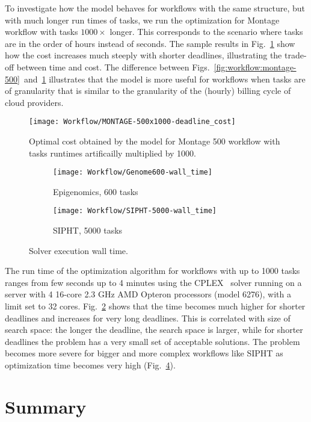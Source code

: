 {    To investigate how the model behaves for workflows with the same structure, but with much longer run times of tasks, we run the optimization for Montage workflow with tasks $1000 \times$ longer. This corresponds to the scenario where tasks are in the order of hours instead of seconds. The sample results in Fig.~\ref{fig:workflow:montage-500x1000} show how the cost increases much steeply with shorter deadlines, illustrating the trade-off between time and cost. The difference between Figs.~\ref{fig:workflow:montage-500}~and~\ref{fig:workflow:montage-500x1000} illustrates that the model is more useful for workflows when tasks are of granularity that is similar to the granularity of the (hourly) billing cycle of cloud providers.    

    \begin{figure}[tb]
       \centering \texttt{[image: Workflow/MONTAGE-500x1000-deadline\_cost]}
       \caption{Optimal cost obtained by the model for Montage 500 workflow with tasks runtimes artificailly 
       multiplied by 1000.
       \label{fig:workflow:montage-500x1000}}
    \end{figure}

    \begin{figure}[tb] 
       \centering
       
       \begin{subfigure}[b]{0.49\textwidth}  
         \texttt{[image: Workflow/Genome600-wall\_time]}
         \caption{Epigenomics, 600 tasks}
         \label{fig:workflow:genome-600-opttime}
       \end{subfigure}
       \begin{subfigure}[b]{0.49\textwidth}
         \texttt{[image: Workflow/SIPHT-5000-wall\_time]}
         \caption{SIPHT, 5000 tasks}
         \label{fig:workflow:sipht-5000-opttime}
       \end{subfigure}
       
       \caption{Solver execution wall time.}
    \end{figure}
  
    
    The run time of the optimization algorithm for workflows with up to 1000 tasks ranges from few seconds up to 4 minutes using the CPLEX~\cite{cplex} solver running on a server with 4 16-core 2.3 GHz AMD Opteron processors (model 6276), with a limit set to 32 cores. Fig.~\ref{fig:workflow:genome-600-opttime} shows that the time becomes much higher for shorter deadlines and increases for very long deadlines. This is correlated with size of search space: the longer the deadline, the search space is larger, while for shorter deadlines the problem has a very small set of acceptable solutions.  The problem becomes more severe for bigger and more complex workflows like SIPHT as optimization time becomes very high (Fig.~\ref{fig:workflow:sipht-5000-opttime}).
    
\section{Summary}

    
} %